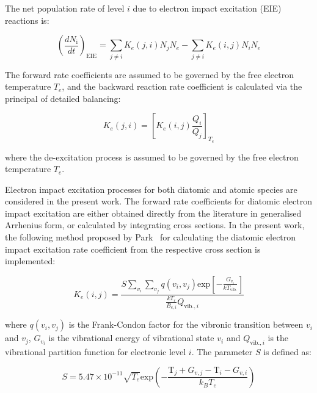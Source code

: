 The net population rate of level $i$ due to electron impact excitation (EIE) reactions is:

\begin{equation}
 \left ( \frac{dN_\text{i}}{dt} \right )_\text{EIE} =  \sum_{j \neq i} K_{e}(j,i) N_{j} N_{e} - \sum_{j \neq i} K_{e} (i,j) N_{i} N_{e} 
\end{equation}

The forward rate coefficients are assumed to be governed by the free electron temperature $T_e$, and the backward reaction rate coefficient is calculated via the principal of detailed balancing:

\begin{equation}
 K_{e}(j,i) = \left [ K_{e}(i,j) \frac{Q_i}{Q_j} \right ]_{T_e}
\end{equation}

\noindent where the de-excitation process is assumed to be governed by the free electron temperature $T_e$.

\par

Electron impact excitation processes for both diatomic and atomic species are considered in the present work.
The forward rate coefficients for diatomic electron impact excitation are either obtained directly from the literature in generalised Arrhenius form, or calculated by integrating cross sections.
In the present work, the following method proposed by Park~\cite{park_1990} for calculating the diatomic electron impact excitation rate coefficient from the respective cross section is implemented:

\begin{equation}
 K_e (i,j) = \frac{S \sum_{v_i} \sum_{v_j} q(v_i, v_j) \text{exp} \left [ - \frac{G_{v_i}}{k T_\text{vib.}} \right ] }{\frac{kT_r}{B_{e,i}} Q_{\text{vib.},i} } \label{eq:within}
\end{equation}

\noindent where $q(v_i, v_j)$ is the Frank-Condon factor for the vibronic transition between $v_i$ and $v_j$, $G_{v_i}$ is the vibrational energy of vibrational state $v_i$ and $Q_{\text{vib.},i}$ is the vibrational partition function for electronic level $i$.
The parameter $S$ is defined as:

\begin{equation}
 S = 5.47 \times 10^{-11} \sqrt{T_e} \text{exp} \left ( - \frac{\mathrm{T}_j + G_{v,j} - \mathrm{T}_i - G_{v,i} }{k_B T_e} \right )
\end{equation}

